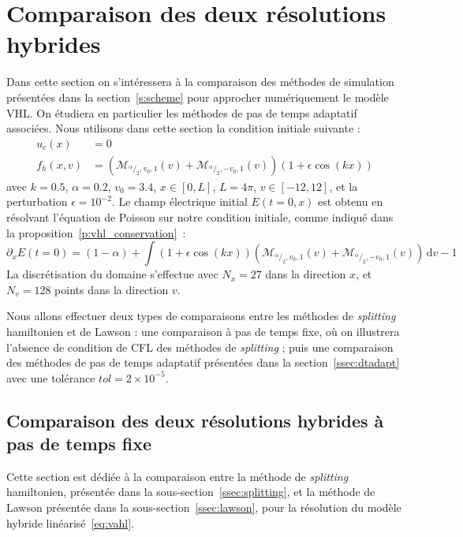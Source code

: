 
\section{Comparaison des deux résolutions hybrides}
\label{s:compare}

Dans cette section on s'intéressera à la comparaison des méthodes de simulation présentées dans la section~\ref{s:scheme} pour approcher numériquement le modèle VHL. On étudiera en particulier les méthodes de pas de temps adaptatif associées. Nous utilisons dans cette section la condition initiale suivante :
$$
  \begin{aligned}
    u_c(x)   &= 0 \\
    f_h(x,v) &=  \left(\mathcal{M}_{^\alpha/_2,v_0,1}(v) +  \mathcal{M}_{^\alpha/_2,-v_0,1}(v) \right)(1 + \epsilon\cos(kx))
  \end{aligned}
$$
avec $k=0.5$, $\alpha=0.2$, $v_0 = 3.4$, $x\in [0,L]$, $L=4\pi$, $v\in[-12,12]$, et la perturbation $\epsilon = 10^{-2}$. Le champ électrique initial $E(t=0,x)$ est obtenu en résolvant l'équation de Poisson sur notre condition initiale, comme indiqué dans la proposition~\ref{p:vhl_conservation}~:
$$
  \partial_x E(t=0) = (1-\alpha) + \int (1+\epsilon\cos(kx))\left( \mathcal{M}_{^\alpha/_2,v_0,1}(v) + \mathcal{M}_{^\alpha/_2,-v_0,1}(v) \right)\,\mathrm{d}v - 1
$$
La discrétisation du domaine s'effectue avec $N_x=27$ dans la direction $x$, et $N_v=128$ points dans la direction $v$.

Nous allons effectuer deux types de comparaisons entre les méthodes de \emph{splitting} hamiltonien et de Lawson : une comparaison à pas de temps fixe, où on illustrera l'absence de condition de CFL des méthodes de \emph{splitting} ; puis une comparaison des méthodes de pas de temps adaptatif présentées dans la section~\ref{ssec:dtadapt} avec une tolérance $tol = 2\times10^{-5}$.

\subsection{Comparaison des deux résolutions hybrides à pas de temps fixe}

Cette section est dédiée à la comparaison entre la méthode de \emph{splitting} hamiltonien, présentée dans la sous-section~\ref{ssec:splitting}, et la méthode de Lawson présentée dans la sous-section~\ref{ssec:lawson}, pour la résolution du modèle hybride linéarisé~\eqref{eq:vahl}.

